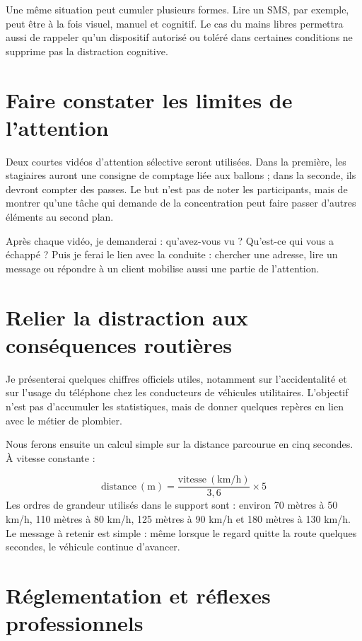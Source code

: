 Une même situation peut cumuler plusieurs formes. Lire un SMS, par exemple, peut être à la fois visuel, manuel et cognitif. Le cas du mains libres permettra aussi de rappeler qu’un dispositif autorisé ou toléré dans certaines conditions ne supprime pas la distraction cognitive.

\section{Faire constater les limites de l’attention}

Deux courtes vidéos d’attention sélective seront utilisées. Dans la première, les stagiaires auront une consigne de comptage liée aux ballons ; dans la seconde, ils devront compter des passes. Le but n’est pas de noter les participants, mais de montrer qu’une tâche qui demande de la concentration peut faire passer d’autres éléments au second plan.

Après chaque vidéo, je demanderai : qu’avez-vous vu ? Qu’est-ce qui vous a échappé ? Puis je ferai le lien avec la conduite : chercher une adresse, lire un message ou répondre à un client mobilise aussi une partie de l’attention.

\section{Relier la distraction aux conséquences routières}

Je présenterai quelques chiffres officiels utiles, notamment sur l’accidentalité et sur l’usage du téléphone chez les conducteurs de véhicules utilitaires. L’objectif n’est pas d’accumuler les statistiques, mais de donner quelques repères en lien avec le métier de plombier.

Nous ferons ensuite un calcul simple sur la distance parcourue en cinq secondes. À vitesse constante :

\[\mathrm{distance\ (m)} = \frac{\mathrm{vitesse\ (km/h)}}{3{,}6}\times 5\]
Les ordres de grandeur utilisés dans le support sont : environ 70 mètres à 50 km/h, 110 mètres à 80 km/h, 125 mètres à 90 km/h et 180 mètres à 130 km/h. Le message à retenir est simple : même lorsque le regard quitte la route quelques secondes, le véhicule continue d’avancer.

\section{Réglementation et réflexes professionnels}

